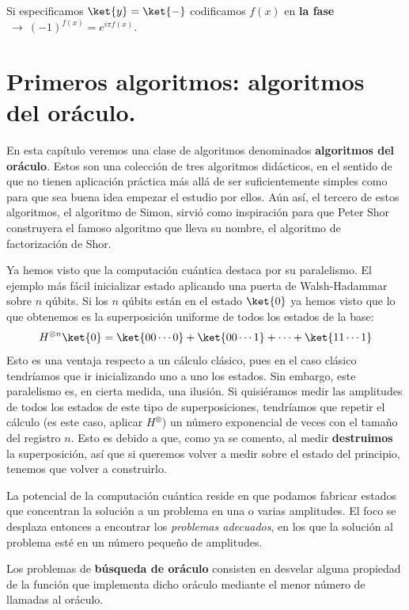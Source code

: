 \documentclass[a4paper,11pt]{book} %
\numberwithin{equation}{chapter}
\begin{document}
Si especificamos $\ket{y} = \ket{-}$ codificamos $f(x)$ en \textbf{la fase} $~\to ~(-1)^{f(x)} = e^{i\pi f(x)}$.




\chapter{Primeros algoritmos: algoritmos del oráculo.}

En esta capítulo veremos una clase de algoritmos denominados \textbf{algoritmos del oráculo}. Estos son una colección de tres algoritmos didácticos, en el sentido de que no tienen aplicación práctica más allá de ser suficientemente simples como para que sea buena idea empezar el estudio por ellos. Aún así, el tercero de estos algoritmos, el algoritmo de Simon, sirvió como inspiración para que Peter Shor construyera el famoso algoritmo que lleva su nombre, el algoritmo de factorización de Shor.

Ya hemos visto que la computación cuántica destaca por su paralelismo. El ejemplo más fácil inicializar estado aplicando una puerta de Walsh-Hadammar sobre $n$ qúbits. Si los $n$ qúbits están en el estado $\ket{0}$ ya hemos visto que lo que obtenemos es la superposición uniforme de todos los estados de la base:
	\begin{equation}
	H^{\otimes n} \ket{0} = \ket{00\cdots0} + \ket{00\cdots1} + \cdots + \ket{11\cdots 1}
	\end{equation}
Esto es una ventaja respecto a un cálculo clásico, pues en el caso clásico tendríamos que ir inicializando uno a uno los estados. Sin embargo, este paralelismo es, en cierta medida, una ilusión.  Si quisiéramos medir las amplitudes de todos los estados de este tipo de superposiciones, tendríamos que repetir el cálculo (es este caso, aplicar $H^{\otimes}$) un número exponencial de veces con el tamaño del registro $n$. Esto es debido a que, como ya se comento, al medir \textbf{destruimos} la superposición, así que si queremos volver a medir sobre el estado del principio, tenemos que volver a construirlo. 

La potencial de la computación cuántica reside en que podamos fabricar estados que concentran la solución a un problema en una o varias amplitudes. El foco se desplaza entonces a encontrar los \textit{problemas adecuados}, en los que la solución al problema esté en un número pequeño de amplitudes. 

Los problemas de \textbf{búsqueda de oráculo} consisten en desvelar alguna propiedad de la función que implementa dicho oráculo mediante el menor número de llamadas al oráculo. 
\end{document}
